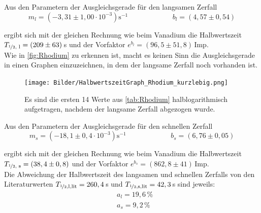 \documentclass[titlepage = firstcover]{scrartcl}
\begin{document}
              \FloatBarrier
              
              Aus den Parametern der Ausgleichsgerade für den langsamen Zerfall
              \begin{equation*}
                  m_l = (-3,31 \pm 1,00 \cdot 10^{-3}) \text{s}^{-1} \hspace{75pt} b_l = (4,57 \pm 0,54)
              \end{equation*}

              ergibt sich mit der gleichen Rechnung wie beim Vanadium die Halbwertszeit $T_{\nicefrac{1}{2} \text{, l}} = (209 \pm 63) \,$s und der Vorfaktor $e^{b_l} = (96,5 \pm 51,8) \,$Imp. \\

              Wie in \autoref{fig:Rhodium} zu erkennen ist, macht es keinen Sinn die Ausgleichsgerade in einen Graphen einzuzeichnen, in dem der langsame Zerfall noch vorhanden ist.
              \begin{figure}[h]
                \centering
                \texttt{[image: Bilder/HalbwertszeitGraph\_Rhodium\_kurzlebig.png]}
                \caption{Es sind die ersten 14 Werte aus \autoref{tab:Rhodium} halblogarithmisch aufgetragen, nachdem der langsame Zerfall abgezogen wurde.}
                \label{fig:RhodiumSchnell}
            \end{figure}

            \FloatBarrier

            Aus den Parametern der Ausgleichsgerade für den schnellen Zerfall
            \begin{equation*}
                m_s = (-18,1 \pm 0,4 \cdot 10^{-3}) \text{s}^{-1} \hspace{75pt} b_s = (6,76 \pm 0,05)
            \end{equation*}

            ergibt sich mit der gleichen Rechnung wie beim Vanadium die Halbwertszeit $T_{\nicefrac{1}{2} \text{, s}} = (38,4 \pm 0,8)$ und der Vorfaktor $e^{b_s} = (862,8 \pm 41) \,$Imp. \\

            Die Abweichung der Halbwertszeit des langsamen und schnellen Zerfalls von den Literaturwerten $T_{\nicefrac{1}{2} \text{,l,lit}} = 260,4 \,$s und $T_{\nicefrac{1}{2} \text{,s,lit}} = 42,3 \,$s sind jeweils:
            \begin{align*}
                &a_l = 19,6 \, \% \\
                &a_s = 9,2 \, \%
            \end{align*}
\end{document}
